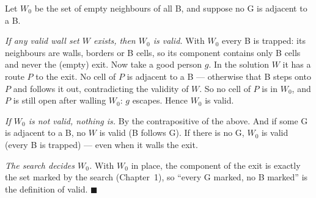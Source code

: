 \begin{invariantbox}
Let $W_0$ be the set of empty neighbours of all B, and suppose no G is adjacent to a B.

\emph{If any valid wall set $W$ exists, then $W_0$ is valid.} With $W_0$ every B is trapped: its neighbours are walls, borders or B cells, so its component contains only B cells and never the (empty) exit. Now take a good person $g$. In the solution $W$ it has a route $P$ to the exit. No cell of $P$ is adjacent to a B --- otherwise that B steps onto $P$ and follows it out, contradicting the validity of $W$. So no cell of $P$ is in $W_0$, and $P$ is still open after walling $W_0$: $g$ escapes. Hence $W_0$ is valid.

\emph{If $W_0$ is not valid, nothing is.} By the contrapositive of the above. And if some G is adjacent to a B, no $W$ is valid (B follows G). If there is no G, $W_0$ is valid (every B is trapped) --- even when it walls the exit.

\emph{The search decides $W_0$.} With $W_0$ in place, the component of the exit is exactly the set marked by the search (Chapter~1), so ``every G marked, no B marked'' is the definition of valid. \hfill$\blacksquare$
\end{invariantbox}

